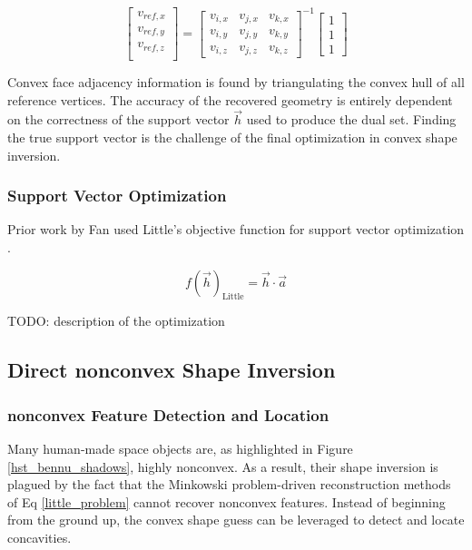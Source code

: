 \begin{equation}
  \begin{bmatrix}
    v_{ref,x} \\
    v_{ref,y} \\
    v_{ref,z} \\
  \end{bmatrix} = \begin{bmatrix}
    v_{i,x} & v_{j,x} & v_{k,x} \\
    v_{i,y} & v_{j,y} & v_{k,y} \\
    v_{i,z} & v_{j,z} & v_{k,z}
  \end{bmatrix}^{-1} \begin{bmatrix}
    1 \\ 1 \\ 1
  \end{bmatrix}
\end{equation}

Convex face adjacency information is found by triangulating the convex hull of all reference vertices. The accuracy of the recovered geometry is entirely dependent on the correctness of the support vector $\vec{h}$ used to produce the dual set. Finding the true support vector is the challenge of the final optimization in convex shape inversion.

\subsubsection{Support Vector Optimization}

Prior work by Fan used Little's objective function for support vector optimization \cite{fan2020thesis,little1983}.

\begin{equation} \label{little_obj}
  f(\vec{h})_{\textrm{Little}} = \vec{h} \cdot \vec{a}
\end{equation} 

TODO: description of the optimization

\subsection{Direct nonconvex Shape Inversion}

\subsubsection{nonconvex Feature Detection and Location}

Many human-made space objects are, as highlighted in Figure \ref{hst_bennu_shadows}, highly nonconvex. As a result, their shape inversion is plagued by the fact that the Minkowski problem-driven reconstruction methods of Eq \ref{little_problem} cannot recover nonconvex features. Instead of beginning from the ground up, the convex shape guess can be leveraged to detect and locate concavities.

